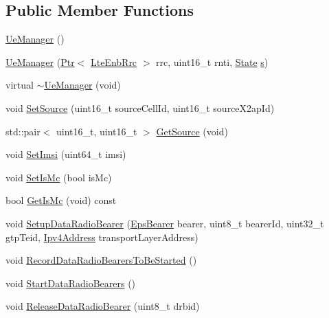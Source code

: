 \subsection*{Public Member Functions}
\begin{DoxyCompactItemize}
\item 
\hyperlink{classns3_1_1UeManager_a7f6e14854c204194328cf9b2464dbf5f}{Ue\+Manager} ()
\item 
\hyperlink{classns3_1_1UeManager_a380a5d0250b2ebd9a2c34cd1cf87e4a2}{Ue\+Manager} (\hyperlink{classns3_1_1Ptr}{Ptr}$<$ \hyperlink{classns3_1_1LteEnbRrc}{Lte\+Enb\+Rrc} $>$ rrc, uint16\+\_\+t rnti, \hyperlink{classns3_1_1UeManager_a2f4085fdd18d7125c27da44a5b8b6808}{State} \hyperlink{generate__test__data__lte__sinr_8m_ad83eeb3a142285d1243a08c6b7026df8}{s})
\item 
virtual \hyperlink{classns3_1_1UeManager_a2593fad5c5cca6eecb9d1dd5379385a7}{$\sim$\+Ue\+Manager} (void)
\item 
void \hyperlink{classns3_1_1UeManager_a94d44301e73fe309a9ebefe8936c058f}{Set\+Source} (uint16\+\_\+t source\+Cell\+Id, uint16\+\_\+t source\+X2ap\+Id)
\item 
std\+::pair$<$ uint16\+\_\+t, uint16\+\_\+t $>$ \hyperlink{classns3_1_1UeManager_a367df7bddfe589cff084c704929bc9a7}{Get\+Source} (void)
\item 
void \hyperlink{classns3_1_1UeManager_a20e9e4c443dd02c40993f8c9e247d5ce}{Set\+Imsi} (uint64\+\_\+t imsi)
\item 
void \hyperlink{classns3_1_1UeManager_a2ce1c42fc55675d2afb7652c35ae11ac}{Set\+Is\+Mc} (bool is\+Mc)
\item 
bool \hyperlink{classns3_1_1UeManager_a65f1479b211f543c780ef5f30a3c54ee}{Get\+Is\+Mc} (void) const 
\item 
void \hyperlink{classns3_1_1UeManager_a75f49cd54eb63c79c696779aa518cf19}{Setup\+Data\+Radio\+Bearer} (\hyperlink{structns3_1_1EpsBearer}{Eps\+Bearer} bearer, uint8\+\_\+t bearer\+Id, uint32\+\_\+t gtp\+Teid, \hyperlink{classns3_1_1Ipv4Address}{Ipv4\+Address} transport\+Layer\+Address)
\item 
void \hyperlink{classns3_1_1UeManager_a104d92b26b4b7fe93099d74080f62ae3}{Record\+Data\+Radio\+Bearers\+To\+Be\+Started} ()
\item 
void \hyperlink{classns3_1_1UeManager_ad03d22d27261b89b6b575e16b5855bd5}{Start\+Data\+Radio\+Bearers} ()
\item 
void \hyperlink{classns3_1_1UeManager_ac36c73f6adf01f326765766bc1d7393a}{Release\+Data\+Radio\+Bearer} (uint8\+\_\+t drbid)

\end{DoxyCompactItemize}
